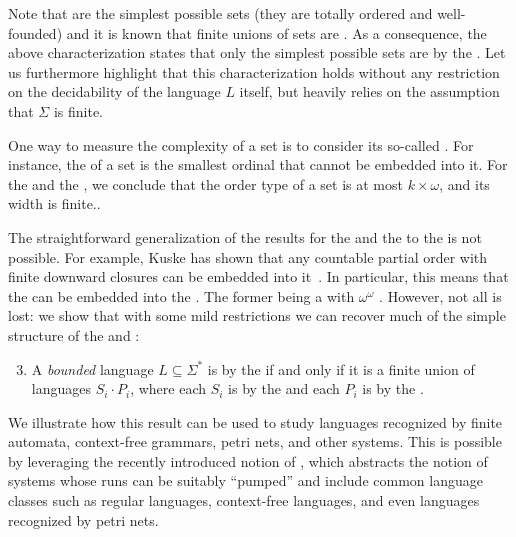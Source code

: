 Note that  are the simplest possible
 sets (they are totally ordered and well-founded) and it
is known that finite unions of  sets are
. As a consequence, the above characterization states
that only the simplest possible  sets are
 by the . Let us furthermore
highlight that this characterization holds without any restriction on the
decidability of the language $L$ itself, but heavily relies on the assumption
that $\Sigma$ is finite. 

\AP One way to measure the complexity of a  set is to
consider its so-called . For instance, the
 of a  set is the smallest ordinal
that cannot be embedded into it. For the  and the , we conclude that the order type of a  set is
at most $k \times \omega$, and its width is finite..

\AP The straightforward generalization of the results for the  and the  to the  is not
possible. For example, Kuske has shown that any countable partial order with
finite downward closures can be embedded into
it~\cite{DBLP:journals/ita/Kuske06}. In particular, this means that the
 can be embedded into the . The former
being a  with  $\omega^\omega$
. However, not all is lost: we show that with some mild restrictions
we can recover much of the simple structure of the 
and :

{
\renewcommand{\labelenumi}{R\arabic{enumi}}
\begin{enumerate}
	\setcounter{enumi}{2}
    \item A \emph{bounded} language $L \subseteq \Sigma^*$ is  by the  if and only if it is a finite union of languages $S_i \cdot P_i$, where each $S_i$ is  by the  and each $P_i$ is  by the .
\end{enumerate}
}

We illustrate how this result can be used to study languages recognized by
finite automata, context-free grammars, petri nets, and other systems. This is
possible by leveraging the recently introduced notion of  \cite{ASZZ24}, which abstracts the notion of systems whose runs can be
suitably ``pumped'' and include common language classes such as regular
languages, context-free languages, and even languages recognized by petri nets.

